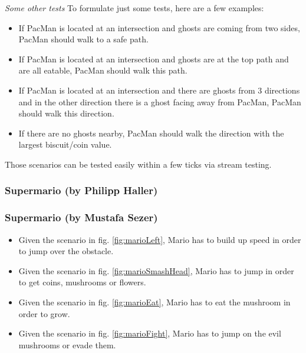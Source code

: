 \emph{Some other tests}\newline
To formulate just some tests, here are a few examples:
\begin{itemize}
	\item If PacMan is located at an intersection and ghosts are coming from two sides, PacMan should walk to a safe path.
	\item If PacMan is located at an intersection and ghosts are at the top path and are all eatable, PacMan should walk this path.
	\item If PacMan is located at an intersection and there are ghosts from 3 directions and in the other direction there is a ghost facing away from PacMan, PacMan should walk this direction.
	\item If there are no ghosts nearby, PacMan should walk the direction with the largest biscuit/coin value.
\end{itemize}

Those scenarios can be tested easily within a few ticks via stream testing.

\subsubsection{Supermario (by Philipp Haller)}



\subsubsection{Supermario (by Mustafa Sezer)}
\begin{itemize}
	\item Given the scenario in fig. \ref{fig:marioLeft}, Mario has to build up speed in order to jump over the obstacle.
	\item Given the scenario in fig. \ref{fig:marioSmashHead}, Mario has to jump in order to get coins, mushrooms or flowers.
	\item Given the scenario in fig. \ref{fig:marioEat}, Mario has to eat the mushroom in order to grow.
	\item Given the scenario in fig. \ref{fig:marioFight}, Mario has to jump on the evil mushrooms or evade them.
\end{itemize}

